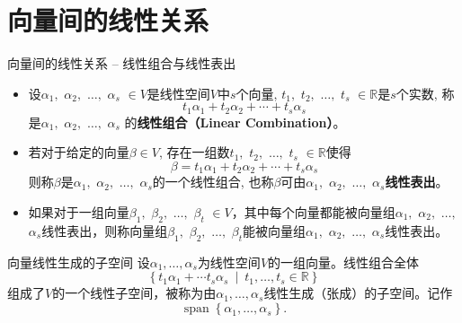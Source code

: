 \documentclass[10pt]{beamer}
\begin{document}

\section{向量间的线性关系}


\begin{frame}

\begin{block}{向量间的线性关系 -- 线性组合与线性表出}
\begin{itemize}
\item<1-> 设$\alpha_1,$ $\alpha_2,$ $\ldots,$ $\alpha_s$ $\in V$是线性空间$V$中$s$个向量, $t_1,$ $t_2,$ $\dots,$ $t_s$ $\in \mathbb{R}$是$s$个实数, 称
$$t_1 \alpha_1 + t_2 \alpha_2 + \cdots + t_s \alpha_s$$
是$\alpha_1,$ $\alpha_2,$ $\ldots,$ $\alpha_s$ 的{\bfseries 线性组合（Linear Combination）}。
\item<2-> 若对于给定的向量$\beta \in V$, 存在一组数$t_1,$ $t_2,$ $\ldots,$ $t_s$ $\in \mathbb{R}$使得
$$\beta = t_1 \alpha_1 + t_2 \alpha_2 + \cdots + t_s \alpha_s$$
则称$\beta$是$\alpha_1,$ $\alpha_2,$ $\ldots,$ $\alpha_s$的一个线性组合, 也称$\beta$可由$\alpha_1,$ $\alpha_2,$ $\ldots,$ $\alpha_s${\bfseries 线性表出}。
\item<3-> 如果对于一组向量$\beta_1,$ $\beta_2,$ $\ldots,$ $\beta_t$ $\in V$，其中每个向量都能被向量组$\alpha_1,$ $\alpha_2,$ $\ldots,$ $\alpha_s$线性表出，则称向量组$\beta_1,$ $\beta_2,$ $\ldots,$ $\beta_t$能被向量组$\alpha_1,$ $\alpha_2,$ $\ldots,$ $\alpha_s$线性表出。
\end{itemize}
\end{block}

\end{frame}


\begin{frame}

\begin{block}{向量线性生成的子空间}
设$\alpha_1,\ldots,\alpha_s$为线性空间$V$的一组向量。线性组合全体
$$\left\{ t_1\alpha_1 + \cdots t_s\alpha_s \ \middle|\ t_1,\ldots,t_s\in\mathbb{R} \right\}$$
组成了$V$的一个线性子空间，被称为由$\alpha_1,\ldots,\alpha_s$线性生成（张成）的子空间。记作
$$\operatorname{span}\left\{\alpha_1, \ldots, \alpha_s\right\}.$$
\end{block}

\end{frame}
\end{document}
